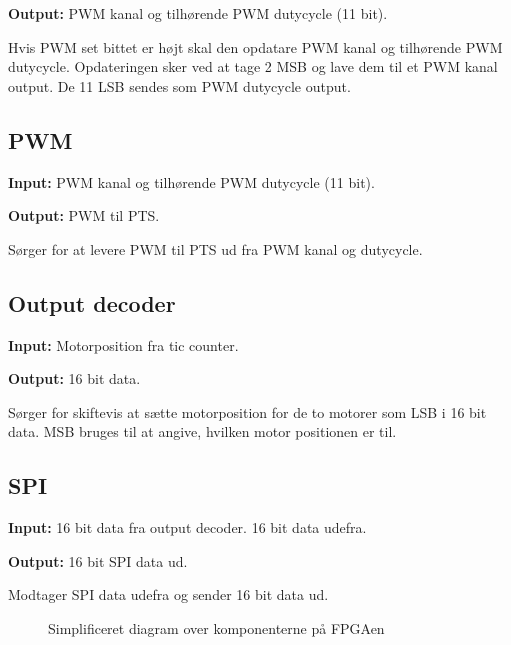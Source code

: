\textbf{Output:} PWM kanal og tilhørende PWM dutycycle (11 bit).

Hvis PWM set bittet er højt skal den opdatare PWM kanal og tilhørende PWM dutycycle.
Opdateringen sker ved at tage 2 MSB og lave dem til et PWM kanal output. De 11 
LSB sendes som PWM dutycycle output.

\subsection*{PWM}
\textbf{Input:} PWM kanal og tilhørende PWM dutycycle (11 bit).

\textbf{Output:} PWM til PTS.

Sørger for at levere PWM til PTS ud fra PWM kanal og dutycycle.

\subsection*{Output decoder}
\textbf{Input:} Motorposition fra tic counter.

\textbf{Output:} 16 bit data.

Sørger for skiftevis at sætte motorposition for de to motorer som LSB i 16 
bit data. MSB bruges til at angive, hvilken motor positionen er til.


\subsection*{SPI}
\textbf{Input:} 16 bit data fra output decoder. 16 bit data udefra.

\textbf{Output:} 16 bit SPI data ud.

Modtager SPI data udefra og sender 16 bit data ud.


\begin{figure}[!th]
\centering
\begin{tikzpicture}[node distance = 5 cm,scale=1]

\end{tikzpicture}
\caption[Diagram over FPGA komponenter]{Simplificeret diagram over komponenterne på FPGAen}
\label{fig:FPGA_blok}
\end{figure}


